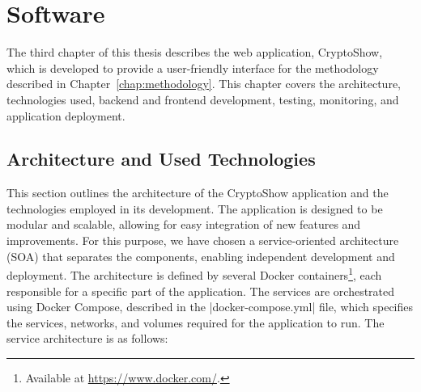 \chapter{Software}
\label{chap:software}

The third chapter of this thesis describes the web application, CryptoShow, which is developed to provide a user-friendly interface for the methodology described in Chapter~\ref{chap:methodology}. This chapter covers the architecture, technologies used, backend and frontend development, testing, monitoring, and application deployment.

\section{Architecture and Used Technologies}
\label{sec:architecture-technologies}

This section outlines the architecture of the CryptoShow application and the technologies employed in its development. The application is designed to be modular and scalable, allowing for easy integration of new features and improvements. For this purpose, we have chosen a service-oriented architecture (SOA) that separates the components, enabling independent development and deployment. The architecture is defined by several Docker containers\footnote{Available at \url{https://www.docker.com/}.}, each responsible for a specific part of the application. The services are orchestrated using Docker Compose, described in the \inline|docker-compose.yml| file, which specifies the services, networks, and volumes required for the application to run. The service architecture is as follows:

